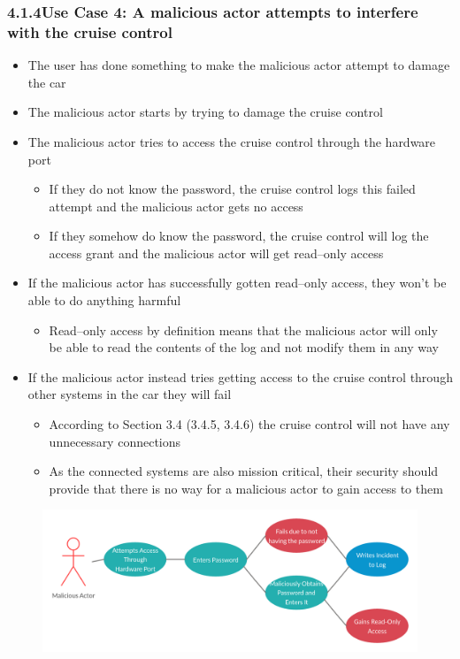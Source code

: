 \documentclass{article}
\begin{document}
	\subsubsection*{4.1.4\quad Use Case 4: A malicious actor attempts to interfere with the cruise control}
	\begin{itemize}
		\item The user has done something to make the malicious actor attempt to damage the car
		\item The malicious actor starts by trying to damage the cruise control
		\item The malicious actor tries to access the cruise control through the hardware port
		\begin{itemize}
			\item If they do not know the password, the cruise control logs this failed attempt and the malicious actor gets no access
			\item If they somehow do know the password, the cruise control will log the access grant and the malicious actor will get read--only access
		\end{itemize}
		\item If the malicious actor has successfully gotten read--only access, they won't be able to do anything harmful
		\begin{itemize}
			\item Read--only access by definition means that the malicious actor will only be able to read the contents of the log and not modify them in any way
		\end{itemize}
		\item If the malicious actor instead tries getting access to the cruise control through other systems in the car they will fail
		\begin{itemize}
			\item According to Section 3.4 (3.4.5, 3.4.6) the cruise control will not have any unnecessary connections
			\item As the connected systems are also mission critical, their security should provide that there is no way for a malicious actor to gain access to them
		\end{itemize}
	\end{itemize}
	
	\begin{figure}[!htb]
		\centering
		\includegraphics[scale=0.184]{UseCase4}
	\end{figure}
	\newpage
\end{document}
